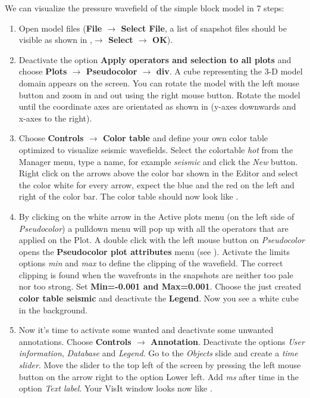 \documentclass[11pt,onecolumn,oneside]{article}
\begin{document}
We can visualize the pressure wavefield of the simple block model in 7 steps:
\begin{enumerate}

\item Open model files ({\bf{File $\rightarrow$ Select File}}, a list of snapshot files should be visible as shown in ,{
{\bf{$\rightarrow$ Select $\rightarrow$ OK}}}).

\item Deactivate the option {\bf{Apply operators and selection to all plots}} and choose {\bf{Plots $\rightarrow$ Pseudocolor $\rightarrow$ div}}. A cube representing the 3-D model domain appears on the screen. You can rotate the model with the left mouse button and zoom in and out using the right mouse button. Rotate the model until the coordinate axes are orientated as shown in  (y-axes downwards and x-axes to the right).  

\item Choose {\bf{Controls $\rightarrow$ Color table}} and define your own color table optimized to visualize seismic wavefields. Select the colortable \textit{hot} from the Manager menu, type a name, for example  \textit{seismic} and click the \textit{New} button.  Right click on the arrows above the color bar shown in the Editor and select the color white for every arrow, expect the blue and the red on the left and right of the color bar. The color table should now look like .    

\item By clicking on the white arrow in the Active plots menu (on the left side of \textit{Pseudocolor}) a pulldown menu will pop up with all the operators that are applied on the Plot. A double click with the left mouse button on \textit{Pseudocolor} opens the {\bf{Pseudocolor plot attributes}} menu (see ). Activate the limits options \textit{min} and \textit{max} to define the clipping of the wavefield. The correct clipping is found when the wavefronts in the snapshots are neither too pale nor too strong. Set {\bf{Min=-0.001 and Max=0.001}}. Choose the just created {\bf{color table seismic}} and deactivate the {\bf{Legend}}. Now you see a white cube in  the background. 

\item Now it's time to activate some wanted and deactivate some unwanted annotations. Choose {\bf{Controls $\rightarrow$ Annotation}}. Deactivate the options \textit{User information}, \textit{Database} and \textit{Legend}. Go to the \textit{Objects} slide and create a \textit{time slider}. Move the slider to the top left of the screen by pressing the left mouse button on the arrow right to the option Lower left. Add \textit{ms} after time in the option \textit{Text label}. Your VisIt window looks now like .  


\end{enumerate}
\end{document}
